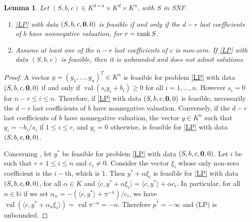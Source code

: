\documentclass{elsarticle}
\theoremstyle{plain}
\newtheorem{lemma}[theorem]{Lemma}
\theoremstyle{definition}
\DeclareMathOperator{\val}{val}
\begin{document}
\begin{lemma}\label{prop:reduc}
  Let $(S,b,c) \in K^{d\times n} \times K^d \times K^n$, with $S$ in SNF.
  \begin{enumerate}
  \item \label{prop:reduc_it1}
    \eqref{LP} with data $(S,b,c,{\bf 0},0)$ is feasible if and only if the $d-r$ last coefficients
    of $b$ have nonnegative valuation, for $r = {\rm rank}\,S$.
  \item \label{prop:reduc_it2}
    Assume at least one of the $n-r$ last coefficients
    of $c$ is non-zero. If \eqref{LP} with
    data $(S,b,c)$ is feasible, then it is unbounded and does not admit solutions.
  \end{enumerate}
\end{lemma}
\begin{proof}
  A vector $y = (y_1, \ldots, y_n)^T \in K^n$ is feasible for problem \eqref{LP} with data
  $(S,b,c,{\bf 0}, 0)$ if and only if $\val(s_i y_i + b_i) \geq 0$ for all $i = 1,\ldots,n$.
  However $s_i = 0$ for $n-r \leq i\leq n$. Therefore, if \eqref{LP} with data $(S,b,c,{\bf 0},0)$
  is feasible,
  necessarily the $d-r$ last coefficients of $b$ have nonnegative valuation.
  Conversely, if the $d-r$ last coefficients of $b$ have nonnegative valuation,
  the vector $y \in K^n$ such that
  $y_i = {-b_i}/{s_i}$ if $1 \leq i \leq r$, and $y_i =0$ otherwise, is feasible for \eqref{LP}
  with data $(S,b,c,{\bf 0},0)$.

  Concerning , let $y^*$ be feasible for problem \eqref{LP} with data
  $(S,b,c,{\bf 0},0)$.
  Let $i$ be such that $r+1 \leq i \leq n$ and $c_i \neq 0$. Consider the vector $\xi_i$ whose
  only non-zero
  coefficient is the $i-$th, which is $1$. Then $y^* + \alpha \xi_i$ is feasible for \eqref{LP}
  with data
  $(S,b,c,{\bf 0},0)$, for all $\alpha \in K$ and $\langle c, y^* + \alpha \xi_i\rangle =
  \langle c, y^* \rangle + \alpha c_i$.
  In particular, for all $n \in \mathbb{N}$ if we set $\alpha_n = -({\langle c, y^* \rangle +
    \pi^{-n}})/{c_i}$,
  we have $\val \left(\langle c, y^* + \alpha_n \xi_i \rangle\right) = \val \pi^{-n} = -n$.
  Therefore $p^* = -\infty$ and (LP) is unbounded.
\end{proof}

\end{document}
